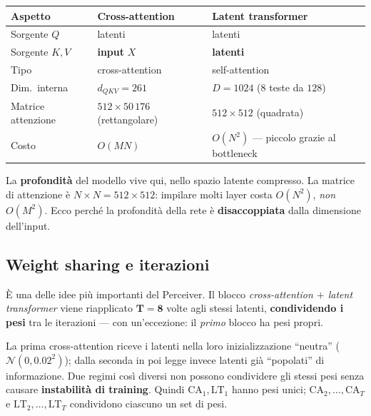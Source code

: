 \documentclass[11pt]{article}
\newcommand{\curstage}{0}
\newcommand{\stage}[1]{\gdef\curstage{#1}}
\begin{document}
\begin{center}
\small
\begin{tabular}{@{}lll@{}}
\toprule
\textbf{Aspetto} & \textbf{Cross-attention} & \textbf{Latent transformer} \\
\midrule
Sorgente $Q$        & latenti              & latenti \\
Sorgente $K,V$      & \textbf{input} $X$   & \textbf{latenti} \\
Tipo                & cross-attention      & self-attention \\
Dim.\ interna       & $d_{QKV}=261$        & $D=1024$ ($8$ teste da $128$) \\
Matrice attenzione  & $512 \times 50\,176$ (rettangolare) & $512 \times 512$ (quadrata) \\
Costo               & $O(MN)$              & $O(N^2)$ --- piccolo grazie al bottleneck \\
\bottomrule
\end{tabular}
\end{center}

\begin{ideabox}[title={\textbf{Idea chiave}}]
La \textbf{profondità} del modello vive qui, nello spazio latente compresso. La matrice di attenzione è $N \times N = 512 \times 512$: impilare molti layer costa $O(N^2)$, \emph{non} $O(M^2)$. Ecco perché la profondità della rete è \textbf{disaccoppiata} dalla dimensione dell'input.
\end{ideabox}

\subsection{Weight sharing e iterazioni}
\label{sec:ws}
\stage{6}

È una delle idee più importanti del Perceiver. Il blocco \emph{cross-attention $+$ latent transformer} viene riapplicato $\mathbf{T = 8}$ volte agli stessi latenti, \textbf{condividendo i pesi} tra le iterazioni --- con un'eccezione: il \emph{primo} blocco ha pesi propri.

\begin{notabox}[title={\textbf{Perché il primo blocco è escluso dallo sharing}}]
La prima cross-attention riceve i latenti nella loro inizializzazione ``neutra'' ($\mathcal{N}(0,0.02^2)$); dalla seconda in poi legge invece latenti già ``popolati'' di informazione. Due regimi così diversi non possono condividere gli stessi pesi senza causare \textbf{instabilità di training}. Quindi $\text{CA}_1, \text{LT}_1$ hanno pesi unici; $\text{CA}_2,\ldots,\text{CA}_T$ e $\text{LT}_2,\ldots,\text{LT}_T$ condividono ciascuno un set di pesi.
\end{notabox}
\end{document}
